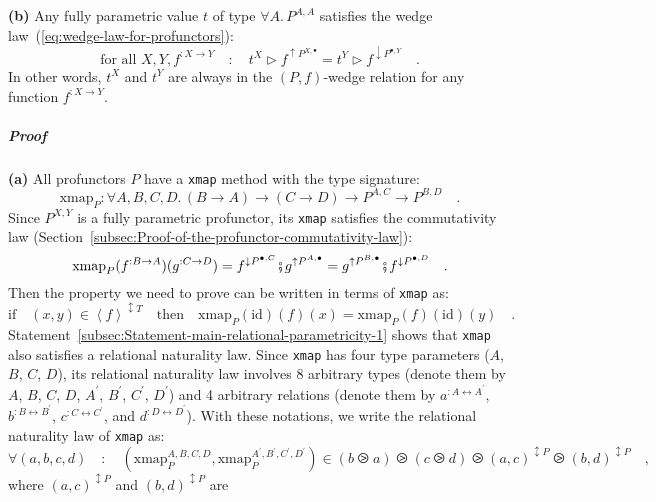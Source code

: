 \textbf{(b)} Any fully parametric value $t$ of type $\forall A.\,P^{A,A}$
satisfies the wedge law~(\ref{eq:wedge-law-for-profunctors}):
\[
\text{for all }X,Y,f^{:X\rightarrow Y}\quad:\quad t^{X}\triangleright f^{\uparrow P^{X,\bullet}}=t^{Y}\triangleright f^{\downarrow P^{\bullet,Y}}\quad.
\]
In other words, $t^{X}$ and $t^{Y}$ are always in the $(P,f)$-wedge
relation for any function $f^{:X\rightarrow Y}$.

\subparagraph{Proof}

\textbf{(a)} All profunctors $P$ have a \lstinline!xmap! method
with the type signature:
\[
\text{xmap}_{P}:\forall A,B,C,D.\,\left(B\rightarrow A\right)\rightarrow\left(C\rightarrow D\right)\rightarrow P^{A,C}\rightarrow P^{B,D}\quad.
\]
Since $P^{X,Y}$ is a fully parametric profunctor, its \lstinline!xmap!
satisfies the commutativity law (Section~\ref{subsec:Proof-of-the-profunctor-commutativity-law}):
\[
\text{xmap}_{P}(f^{:B\rightarrow A})(g^{:C\rightarrow D})=f^{\downarrow P^{\bullet,C}}\bef g^{\uparrow P^{A,\bullet}}=g^{\uparrow P^{B,\bullet}}\bef f^{\downarrow P^{\bullet,D}}\quad.
\]
Then the property we need to prove can be written in terms of \lstinline!xmap!
as:
\begin{equation}
\text{if}\quad(x,y)\in\left<f\right>^{\updownarrow T}\quad\text{then}\quad\text{xmap}_{P}(\text{id})(f)(x)=\text{xmap}_{P}(f)(\text{id})(y)\quad.\label{eq:wedge-law-from-parametricity-derivation1}
\end{equation}
Statement~\ref{subsec:Statement-main-relational-parametricity-1}
shows that \lstinline!xmap! also satisfies a relational naturality
law. Since \lstinline!xmap! has four type parameters ($A$, $B$,
$C$, $D$), its relational naturality law involves 8 arbitrary types
(denote them by $A$, $B$, $C$, $D$, $A^{\prime}$, $B^{\prime}$,
$C^{\prime}$, $D^{\prime}$) and 4 arbitrary relations (denote them
by $a^{:A\leftrightarrow A^{\prime}}$, $b^{:B\leftrightarrow B^{\prime}}$,
$c^{:C\leftrightarrow C^{\prime}}$, and $d^{:D\leftrightarrow D^{\prime}}$).
With these notations, we write the relational naturality law of \lstinline!xmap!
as:
\begin{equation}
\forall(a,b,c,d)\quad:\quad(\text{xmap}_{P}^{A,B,C,D},\text{xmap}_{P}^{A^{\prime},B^{\prime},C^{\prime},D^{\prime}})\in(b\ogreaterthan a)\ogreaterthan(c\ogreaterthan d)\ogreaterthan(a,c)^{\updownarrow P}\ogreaterthan(b,d)^{\updownarrow P}\quad,\label{eq:relational-naturality-law-of-xmap}
\end{equation}
where $(a,c)^{\updownarrow P}$ and $(b,d)^{\updownarrow P}$ are
